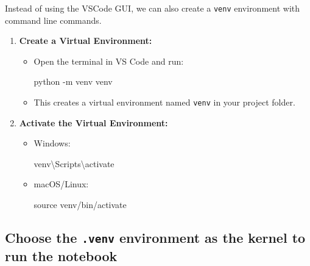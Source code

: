 \documentclass[
  letterpaper,
  DIV=11,
  numbers=noendperiod]{scrreprt}
\newenvironment{Shaded}{\begin{snugshade}}{\end{snugshade}}
\newcommand{\AttributeTok}[1]{\textcolor[rgb]{0.40,0.45,0.13}{#1}}
\newcommand{\BuiltInTok}[1]{\textcolor[rgb]{0.00,0.23,0.31}{#1}}
\newcommand{\ExtensionTok}[1]{\textcolor[rgb]{0.00,0.23,0.31}{#1}}
\newcommand{\NormalTok}[1]{\textcolor[rgb]{0.00,0.23,0.31}{#1}}
\providecommand{\tightlist}{%
  \setlength{\itemsep}{0pt}\setlength{\parskip}{0pt}}\usepackage{longtable,booktabs,array}
\begin{document}
Instead of using the VSCode GUI, we can also create a \texttt{venv}
environment with command line commands.

\begin{enumerate}
\def\labelenumi{\arabic{enumi}.}
\tightlist
\item
  \textbf{Create a Virtual Environment:}

  \begin{itemize}
  \item
    Open the terminal in VS Code and run:

\begin{Shaded}
\begin{Highlighting}[]
\ExtensionTok{python} \AttributeTok{{-}m}\NormalTok{ venv venv}
\end{Highlighting}
\end{Shaded}
  \item
    This creates a virtual environment named \texttt{venv} in your
    project folder.
  \end{itemize}
\item
  \textbf{Activate the Virtual Environment:}

  \begin{itemize}
  \item
    Windows:

\begin{Shaded}
\begin{Highlighting}[]
\ExtensionTok{venv\textbackslash{}Scripts\textbackslash{}activate}
\end{Highlighting}
\end{Shaded}
  \item
    macOS/Linux:

\begin{Shaded}
\begin{Highlighting}[]
\BuiltInTok{source}\NormalTok{ venv/bin/activate}
\end{Highlighting}
\end{Shaded}
  \end{itemize}
\end{enumerate}

\hypertarget{choose-the-.venv-environment-as-the-kernel-to-run-the-notebook}{%
\subsection{\texorpdfstring{Choose the \texttt{.venv} environment as the
kernel to run the
notebook}{Choose the .venv environment as the kernel to run the notebook}}\label{choose-the-.venv-environment-as-the-kernel-to-run-the-notebook}}
\end{document}
